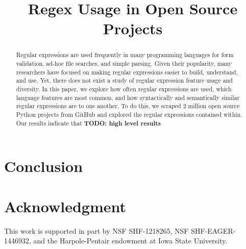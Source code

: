 \documentclass[conference]{IEEEtran}
\newcommand{\todo}[1]{\textbf{TODO: #1}}
\begin{document}
%
\title{Regex Usage in  Open Source Projects}


\author{
}

\maketitle


\begin{abstract}
Regular expressions are used frequently in many programming languages for form validation,
ad-hoc file searches, and simple parsing. Given their popularity, many researchers have focused on
making regular expressions easier to build, understand, and use. Yet, there does not exist a study of
regular expression feature usage and diversity. In this paper, we explore how often regular expressions are used, which language features are most common, and how syntactically and semantically similar regular expressions are to one another. To do this, we scraped 2 million open source Python projects from GitHub and explored the regular expressions contained within. Our results indicate that \todo{high level results}
\end{abstract}

















\section{Conclusion}


\section*{Acknowledgment}
This work is supported in part by NSF SHF-1218265, NSF SHF-EAGER-1446932, and the Harpole-Pentair endowment at Iowa State University.






\balance


\end{document}
